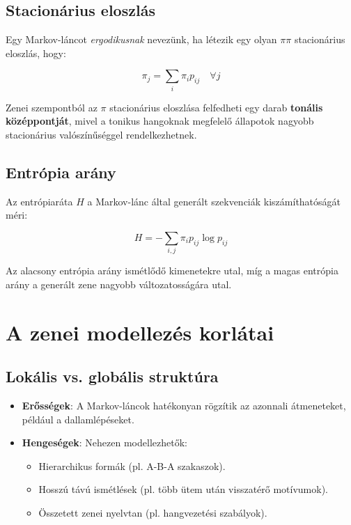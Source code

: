 \subsection{Stacionárius eloszlás}

Egy Markov-láncot \textit{ergodikusnak} nevezünk, ha létezik egy olyan \( \pi \pi \) stacionárius eloszlás, hogy:

\[
\pi_j = \sum_{i} \pi_i p_{ij} \quad \forall j
\]

Zenei szempontból az \( \pi \) stacionárius eloszlása felfedheti egy darab \textbf{tonális középpontját}, mivel a tonikus hangoknak megfelelő állapotok nagyobb stacionárius valószínűséggel rendelkezhetnek.

\subsection{Entrópia arány}

Az entrópiaráta \( H \) a Markov-lánc által generált szekvenciák kiszámíthatóságát méri:

\[
H = -\sum_{i,j} \pi_i p_{ij} \log p_{ij}
\]

Az alacsony entrópia arány ismétlődő kimenetekre utal, míg a magas entrópia arány a generált zene nagyobb változatosságára utal.

\section{A zenei modellezés korlátai}

\subsection{Lokális vs. globális struktúra}

\begin{itemize}
    \item \textbf{Erősségek}: A Markov-láncok hatékonyan rögzítik az azonnali átmeneteket, például a dallamlépéseket.
    \item \textbf{Hengeségek}: Nehezen modellezhetők:
    \begin{itemize}
        \item Hierarchikus formák (pl. A-B-A szakaszok).
        \item Hosszú távú ismétlések (pl. több ütem után visszatérő motívumok).
        \item Összetett zenei nyelvtan (pl. hangvezetési szabályok).
    \end{itemize}
\end{itemize}

